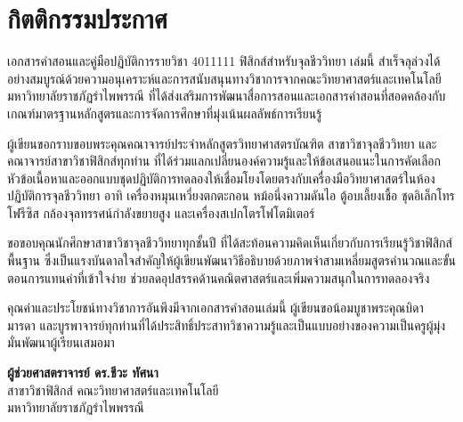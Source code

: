 \chapter*{กิตติกรรมประกาศ}

เอกสารคำสอนและคู่มือปฏิบัติการรายวิชา 4011111 ฟิสิกส์สำหรับจุลชีววิทยา เล่มนี้ สำเร็จลุล่วงได้อย่างสมบูรณ์ด้วยความอนุเคราะห์และการสนับสนุนทางวิชาการจากคณะวิทยาศาสตร์และเทคโนโลยี มหาวิทยาลัยราชภัฏรำไพพรรณี ที่ได้ส่งเสริมการพัฒนาสื่อการสอนและเอกสารคำสอนที่สอดคล้องกับเกณฑ์มาตรฐานหลักสูตรและการจัดการศึกษาที่มุ่งเน้นผลลัพธ์การเรียนรู้

ผู้เขียนขอกราบขอบพระคุณคณาจารย์ประจำหลักสูตรวิทยาศาสตรบัณฑิต สาขาวิชาจุลชีววิทยา และคณาจารย์สาขาวิชาฟิสิกส์ทุกท่าน ที่ได้ร่วมแลกเปลี่ยนองค์ความรู้และให้ข้อเสนอแนะในการคัดเลือกหัวข้อเนื้อหาและออกแบบชุดปฏิบัติการทดลองให้เชื่อมโยงโดยตรงกับเครื่องมือวิทยาศาสตร์ในห้องปฏิบัติการจุลชีววิทยา อาทิ เครื่องหมุนเหวี่ยงตกตะกอน หม้อนึ่งความดันไอ ตู้อบเลี้ยงเชื้อ ชุดอิเล็กโทรโฟรีซิส กล้องจุลทรรศน์กำลังขยายสูง และเครื่องสเปกโตรโฟโตมิเตอร์

ขอขอบคุณนักศึกษาสาขาวิชาจุลชีววิทยาทุกชั้นปี ที่ได้สะท้อนความคิดเห็นเกี่ยวกับการเรียนรู้วิชาฟิสิกส์พื้นฐาน ซึ่งเป็นแรงบันดาลใจสำคัญให้ผู้เขียนพัฒนาวิธีอธิบายด้วยภาพจำสามเหลี่ยมสูตรคำนวณและขั้นตอนการแทนค่าที่เข้าใจง่าย ช่วยลดอุปสรรคด้านคณิตศาสตร์และเพิ่มความสนุกในการทดลองจริง

คุณค่าและประโยชน์ทางวิชาการอันพึงมีจากเอกสารคำสอนเล่มนี้ ผู้เขียนขอน้อมบูชาพระคุณบิดา มารดา และบูรพาจารย์ทุกท่านที่ได้ประสิทธิ์ประสาทวิชาความรู้และเป็นแบบอย่างของความเป็นครูผู้มุ่งมั่นพัฒนาผู้เรียนเสมอมา

\vspace{1.2cm}
\begin{flushright}
    \textbf{ผู้ช่วยศาสตราจารย์ ดร.ชีวะ ทัศนา}\\[0.2cm]
    สาขาวิชาฟิสิกส์ คณะวิทยาศาสตร์และเทคโนโลยี\\
    มหาวิทยาลัยราชภัฏรำไพพรรณี
\end{flushright}
